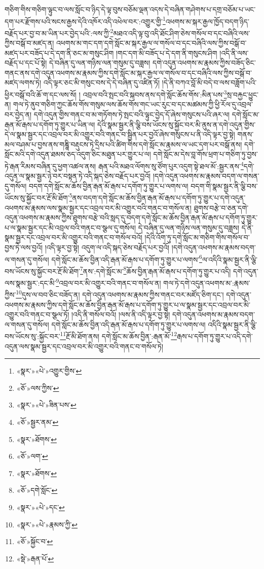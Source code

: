 གཅིག་གིས་གཅིག་ལྟུང་བ་ལས་སློང་བ་ཉིད་དེ་ལྟ་བུས་བཅོམ་ལྡན་འདས་དེ་བཞིན་གཤེགས་པ་དགྲ་བཅོམ་པ་ཡང་དག་པར་རྫོགས་པའི་སངས་རྒྱས་དེའི་འཁོར་འདི་འཕེལ་བར་:འགྱུར་གྱི་\footnote{«སྣར་»«པེ་»འགྱུར་གྱིས་}འཕགས་མ་སྐར་རྒྱལ་ཁྱོད་བདག་ཉིད་བརྗོད་པར་བྱ་བ་མ་ཡིན་པར་བྱེད་པའི་:ལས་ཀྱི་\footnote{«ཅོ་»ལས་ཀྱིས་}མཐའ་འདི་ལྟ་བུ་འདི་ཐོང་ཤིག་ཅེས་གསོལ་བ་དང་བཞིའི་ལས་ཀྱིས་བསྒོ་བ་མཛད་ན། འཕགས་མ་གང་དག་དགེ་སློང་མ་སྐར་རྒྱལ་ལ་གསོལ་བ་དང་བཞིའི་ལས་ཀྱིས་བསྒོ་བ་མཛད་པར་བཟོད་པ་དེ་དག་ནི་ཅང་མ་གསུང་ཤིག །གང་དག་མི་བཟོད་པ་དེ་དག་ནི་གསུངས་ཤིག །འདི་ནི་ལས་བརྗོད་པ་དང་པོ་སྟེ། དེ་བཞིན་དུ་ལན་གཉིས་ལན་གསུམ་དུ་བཟླས། དགེ་འདུན་འཕགས་མ་རྣམས་ཀྱིས་བཟོད་ཅིང་གནང་ནས་དགེ་འདུན་འཕགས་མ་རྣམས་ཀྱིས་དགེ་སློང་མ་སྐར་རྒྱལ་ལ་གསོལ་བ་དང་བཞིའི་ལས་ཀྱིས་བསྒོ་བ་མཛད་ལགས་ཏེ། འདི་ལྟར་ཅང་མི་གསུང་བས་དེ་དེ་བཞིན་དུ་འཛིན་ཏོ། །དེ་ནི་བཀའ་བློ་མི་བདེ་བ་ལས་བཟློག་པའི་ཕྱིར་བསྒོ་བའི་ཆོ་ག་དང་ལས་སོ། །
འབྲལ་བའི་སྤང་བའི་སྐབས་ནས་དགེ་སློང་ཆོས་གོས་:མིན་པས་\footnote{«སྣར་»«པེ་»ཟིན་པས་}སྲ་བརྐྱང་ཕྱུང་ན། གལ་ཏེ་ནུབ་གཅིག་ཀྱང་ཆོས་གོས་གསུམ་ལས་ཆོས་གོས་གང་ཡང་རུང་བ་དང་མཚམས་ཀྱི་ཕྱི་རོལ་དུ་འབྲལ་བར་བྱེད་ན། དགེ་འདུན་གྱིས་གནང་བ་མ་གཏོགས་ཏེ་སྤང་བའི་ལྟུང་བྱེད་དོ་ཞེས་གསུངས་པའི་ཞར་ལ། དགེ་སློང་མ་རྒན་མོ་རྒས་པ་དགོག་ཏུ་གྱུར་པ་ཡིན་ལ། དེའི་སྣམ་སྦྱར་ནི་ལྕི་བས་ཡོངས་སུ་སྐྱོང་བར་མི་ནུས་ན་དགེ་འདུན་གྱིས་དེ་ལ་སྣམ་སྦྱར་དང་འབྲལ་བར་མི་འགྱུར་བའི་གནང་བ་སྦྱིན་པར་བྱའོ་ཞེས་གསུངས་པ་ནི་འདི་ལྟར་བྱ་སྟེ། གནས་མལ་བཤམ་པ་བྱས་ནས་གཎྜཱི་བརྡུངས་ཏེ་དྲིས་པའི་ཚིག་གིས་དགེ་སློང་མ་རྣམས་ལ་ཡང་དག་པར་བསྒོ་ནས། དགེ་སློང་མའི་དགེ་འདུན་ཐམས་ཅད་འདུག་ཅིང་མཐུན་པར་གྱུར་པ་ལ། དགེ་སློང་མ་དེས་བླ་གོས་ཕྲག་པ་གཅིག་ཏུ་བྱས་ཏེ་རྒན་རིམས་བཞིན་དུ་ཕྱག་འཚལ་ནས། རྒན་པའི་མཐའ་ལོགས་སུ་ཙོག་པུར་འདུག་སྟེ་ཐལ་མོ་:སྦྱར་ནས་\footnote{«ཅོ་»སྦྱར་ནམ་}དགེ་འདུན་ལ་སྣམ་སྦྱར་ཉེ་བར་བསྟན་ཏེ་འདི་སྐད་ཅེས་བརྗོད་པར་བྱའོ། །དགེ་འདུན་འཕགས་མ་རྣམས་བདག་ལ་གསན་དུ་གསོལ། བདག་དགེ་སློང་མ་ཆོས་བྱིན་རྒན་མོ་རྒས་པ་དགོག་ཏུ་གྱུར་པ་ལགས་ལ། བདག་གི་སྣམ་སྦྱར་ནི་ལྕི་བས་ཡོངས་སུ་སྐྱོང་བར་རྔོ་མི་ཐོག་\footnote{«སྣར་»ཐོགས་}ནས་བདག་དགེ་སློང་མ་ཆོས་བྱིན་རྒན་མོ་རྒས་པ་དགོག་ཏུ་གྱུར་པ་དགེ་འདུན་འཕགས་མ་རྣམས་ལས་སྣམ་སྦྱར་དང་འབྲལ་བར་མི་འགྱུར་བའི་གནང་བ་གསོལ་ན། ཐུགས་བརྩེ་བ་ཅན་དགེ་འདུན་འཕགས་མ་རྣམས་ཀྱིས་ཐུགས་བརྩེ་བའི་སླད་དུ་བདག་དགེ་སློང་མ་ཆོས་བྱིན་རྒན་མོ་རྒས་པ་དགོག་ཏུ་གྱུར་པ་ལ་སྣམ་སྦྱར་དང་མི་འབྲལ་བའི་གནང་བ་སྩལ་དུ་གསོལ། དེ་བཞིན་དུ་ལན་གཉིས་ལན་གསུམ་དུ་བཟླས། དེ་ནི་སྣམ་སྦྱར་དང་འབྲལ་བར་མི་འགྱུར་བའི་གནང་བ་གསོལ་བའོ། །དེའི་འོག་ཏུ་དགེ་སློང་མ་གཅིག་གིས་གསོལ་བ་བྱས་ཏེ་ལས་བྱའོ། །འདི་ལྟར་བྱ་སྟེ། འདུག་ལ་འདི་སྐད་ཅེས་བརྗོད་པར་བྱའོ། །དགེ་འདུན་འཕགས་མ་རྣམས་བདག་ལ་གསན་དུ་གསོལ། དགེ་སློང་མ་ཆོས་བྱིན་འདི་རྒན་མོ་རྒས་པ་དགོག་ཏུ་གྱུར་པ་ལགས་\footnote{«ཅོ་»ལག་}ལ་འདིའི་སྣམ་སྦྱར་ནི་ལྕི་བས་ཡོངས་སུ་སྐྱོང་བར་རྔོ་མི་ཐོག་\footnote{«སྣར་»ཐོགས་}ནས་:དགེ་སློང་མ་\footnote{«ཅོ་»དགེ་སློང་}ཆོས་བྱིན་རྒན་མོ་རྒས་པ་དགོག་ཏུ་གྱུར་པ་འདི། དགེ་འདུན་ལས་སྣམ་སྦྱར་:དང་མི་\footnote{«སྣར་»«པེ་»དང་}འབྲལ་བར་མི་འགྱུར་བའི་གནང་བ་གསོལ་ན། གལ་ཏེ་དགེ་འདུན་འཕགས་མ་:རྣམས་ཀྱིས་\footnote{«སྣར་»«པེ་»རྣམས་ཀྱི་}དུས་ལ་བབ་ཅིང་བཟོད་ན། དགེ་འདུན་འཕགས་མ་རྣམས་ཀྱིས་གནང་བར་མཛོད་ཅིག་དང་། དགེ་འདུན་འཕགས་མ་རྣམས་ཀྱིས་དགེ་སློང་མ་ཆོས་བྱིན་རྒན་མོ་རྒས་པ་དགོག་ཏུ་གྱུར་པ་ལ་སྣམ་སྦྱར་དང་འབྲལ་བར་མི་འགྱུར་བའི་གནང་བ་སྩལ་ཏོ། །འདི་ནི་གསོལ་བའོ། །ལས་ནི་འདི་ལྟར་བྱ་སྟེ། དགེ་འདུན་འཕགས་མ་རྣམས་བདག་ལ་གསན་དུ་གསོལ། དགེ་སློང་མ་ཆོས་བྱིན་འདི་རྒན་མོ་རྒས་པ་དགོག་ཏུ་གྱུར་པ་ལགས་ལ། འདིའི་སྣམ་སྦྱར་ནི་ལྕི་བས་ཡོངས་སུ་:སྐྱོང་བར་\footnote{«ཅོ་»སྐྱོང་བ་}རྔོ་མི་ཐོག་ནས། དགེ་སློང་མ་ཆོས་བྱིན་:རྒན་མོ་\footnote{«སྡེ་»རྒན་པོ་}རྒས་པ་དགོག་ཏུ་གྱུར་པ་འདི་དགེ་འདུན་ལས་སྣམ་སྦྱར་དང་འབྲལ་བར་མི་འགྱུར་བའི་གནང་བ་གསོལ་ཏེ། 